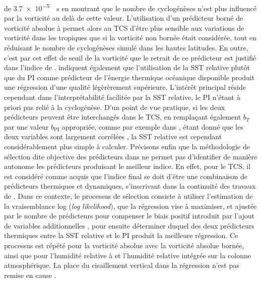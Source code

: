 \documentclass[../main.tex]{subfiles}
\begin{document}
de \SI{3.7e-5}{\per\second} en montrant que le nombre de cyclogénèses n'est plus influencé par la vorticité au delà de cette valeur. L'utilisation d'un
prédicteur borné de vorticité absolue à  permet alors au TCS d'être plus sensible aux variations de vorticité dans les tropiques que si la vorticité
non bornée était considérée, tout en réduisant le nombre de cyclogénèses simulé dans les hautes latitudes. En outre, c'est par cet effet de seuil de la
vorticité que le retrait de ce prédicteur est justifié dans l'indice de \textcite{bruyere_investigating_2012}. \citeauthor{tippett_poisson_2011} indiquent
également que l'utilisation de la SST relative plutôt que du PI comme prédicteur de l'énergie thermique océanique disponible produit une régression d'une
qualité légèrèrement supérieure. L'intérêt principal réside cependant dans l'interprétabilité facilitée par la SST relative, le PI n'étant à priori pas relié à
la cyclogénèse. D'un point de vue pratique, si les deux prédicteurs peuvent être interchangés dans le TCS, en remplaçant également $b_T$ par une valeur
$b_{\mathrm{PI}}$ appropriée, comme par exemple dans \textcite{camargo_testing_2014,camargo_tropical_2016}, étant donné que les deux variables sont largement
corrélées \parencite{vecchi_effect_2007,swanson_nonlocality_2008}, la SST relative est cependant considérablement plus simple à calculer. Précisons enfin que la
méthodologie de sélection dite objective des prédicteurs dans \textcite{tippett_poisson_2011} ne permet pas d'identifier de manière autonome les prédicteurs
produisant le meilleur indice. En effet, pour le TCS, il est considéré comme acquis que l'indice final se doit d'être une combinaison de prédicteurs thermiques
et dynamiques, s'inscrivant dans la continuité des travaux de \textcite{gray_tropical_1975}. Dans ce contexte, le processus de sélection consiste à utiliser
l'estimation de la vraisemblance log (\textit{log likelihood}), que la régression vise à maximiser, et ajustée par le nombre de prédicteurs pour compenser le
biais positif introduit par l'ajout de variables additionnelles \parencite{akaike_information_1998}, pour ensuite déterminer duquel des deux prédicteurs
thermiques entre la SST relative et le PI produit la meilleure régression. Ce processus est répété pour la vorticité absolue avec la vorticité absolue bornée,
ainsi que pour l'humidité relative à  et l'humidité relative intégrée sur la colonne atmosphérique. La place du cisaillement vertical dans la
régression n'est pas remise en cause \parencite{gray_global_1968}.
%
\end{document}
